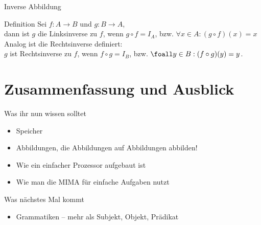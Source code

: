 \begin{frame}{Inverse Abbildung}
    \begin{block}{Definition}
        Sei $f: A \to B$ und $g: B \to A$, \\
        dann ist $g$ die Linksinverse zu $f$, wenn $g \circ f = I_A$, bzw. $\forall x \in A: (g \circ f)(x) = x$ \\
        Analog ist die Rechtsinverse definiert: \\
        $g$ ist Rechtsinverse zu $f$, wenn $f \circ g = I_B$, bzw. $\foall y \in B: (f \circ g)(y) = y$.
    \end{block}
\end{frame}



%






\appendix
\beginbackup

\section{Zusammenfassung und Ausblick}

\begin{frame}	
	\begin{block}{Was ihr nun wissen solltet}
		\begin{itemize}
			\item Speicher
			\item Abbildungen, die Abbildungen auf Abbildungen abbilden!
			\item Wie ein einfacher Prozessor aufgebaut ist
			\item Wie man die MIMA für einfache Aufgaben nutzt
		\end{itemize}
	\end{block}
	
	\begin{block}{Was nächstes Mal kommt}
		\begin{itemize}
			\item Grammatiken – mehr als Subjekt, Objekt, Prädikat
		\end{itemize}
	\end{block}
\end{frame}




\backupend

